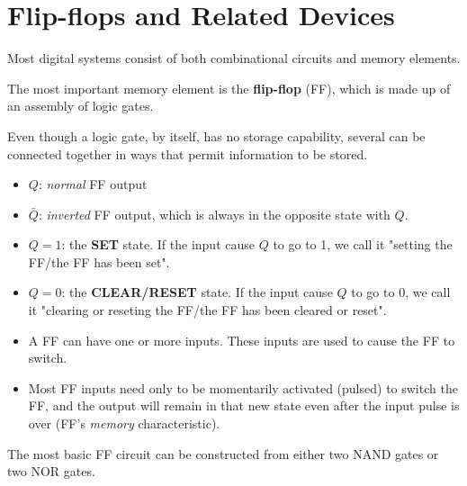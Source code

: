 \chapter{Flip-flops and Related Devices}

    \par Most digital systems consist of both combinational circuits and
    memory elements.
    \par The most important memory element is the \textbf{flip-flop} (FF),
    which is made up of an assembly of logic gates.
    \par Even though a logic gate, by itself, has no storage capability,
    several can be connected together in ways that permit information
    to be stored.
    \begin{itemize}
        \item $Q$: \textit{normal} FF output
        \item $\bar{Q}$: \textit{inverted} FF output, which is always in the
        opposite state with $Q$.
        \item $Q = 1$: the \textbf{SET} state. If the input cause $Q$ to go to 1,
        we call it "setting the FF/the FF has been set".
        \item $Q = 0$: the \textbf{CLEAR/RESET} state. If the input cause $Q$ to
        go to 0, we call it "clearing or reseting the FF/the FF has been cleared
        or reset".
        \item A FF can have one or more inputs. These inputs are used to cause the
        FF to switch.
        \item Most FF inputs need only to be momentarily activated (pulsed) to switch
        the FF, and the output will remain in that new state even after the input
        pulse is over (FF's \textit{memory} characteristic).
    \end{itemize}
    \par The most basic FF circuit can be constructed from either two NAND gates or
    two NOR gates.

